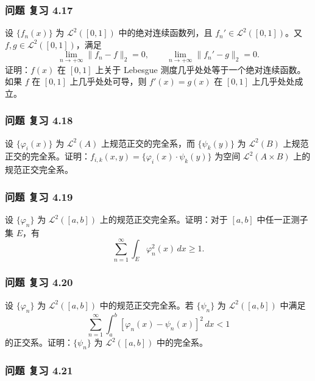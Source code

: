 \documentclass[11pt,a4paper]{article}
\begin{document}
\subsubsection{问题 复习 4.17}\label{ch04-practice-ux95eeux9898-ux590dux4e60-4.17}

设 \(\{f_n(x)\}\) 为 \(\mathcal L^2([0,1])\) 中的绝对连续函数列，且
\(f_n'\in\mathcal L^2([0,1])\)。又 \(f,g\in\mathcal L^2([0,1])\)，满足
\[
\lim_{n\to+\infty}\|f_n-f\|_2=0,\qquad
\lim_{n\to+\infty}\|f_n'-g\|_2=0.
\] 证明：\(f(x)\) 在 \([0,1]\) 上关于 Lebesgue
测度几乎处处等于一个绝对连续函数。如果 \(f\) 在 \([0,1]\)
上几乎处处可导，则 \(f'(x)=g(x)\) 在 \([0,1]\) 上几乎处处成立。

\subsubsection{问题 复习 4.18}\label{ch04-practice-ux95eeux9898-ux590dux4e60-4.18}

设 \(\{\varphi_i(x)\}\) 为 \(\mathcal L^2(A)\) 上规范正交的完全系，而
\(\{\psi_k(y)\}\) 为 \(\mathcal L^2(B)\)
上规范正交的完全系。证明：\(f_{i,k}(x,y)=\{\varphi_i(x)\cdot\psi_k(y)\}\)
为空间 \(\mathcal L^2(A\times B)\) 上的规范正交完全系。

\subsubsection{问题 复习 4.19}\label{ch04-practice-ux95eeux9898-ux590dux4e60-4.19}

设 \(\{\varphi_n\}\) 为 \(\mathcal L^2([a,b])\)
上的规范正交完全系。证明：对于 \([a,b]\) 中任一正测子集 \(E\)，有 \[
\sum_{n=1}^\infty\int_E\varphi_n^2(x)\,dx\ge1.
\]

\subsubsection{问题 复习 4.20}\label{ch04-practice-ux95eeux9898-ux590dux4e60-4.20}

设 \(\{\varphi_n\}\) 为 \(\mathcal L^2([a,b])\) 中的规范正交完全系。若
\(\{\psi_n\}\) 为 \(\mathcal L^2([a,b])\) 中满足 \[
\sum_{n=1}^\infty\int_a^b[\varphi_n(x)-\psi_n(x)]^2\,dx<1
\] 的正交系。证明：\(\{\psi_n\}\) 为 \(\mathcal L^2([a,b])\)
中的完全系。

\subsubsection{问题 复习 4.21}\label{ch04-practice-ux95eeux9898-ux590dux4e60-4.21}
\end{document}
